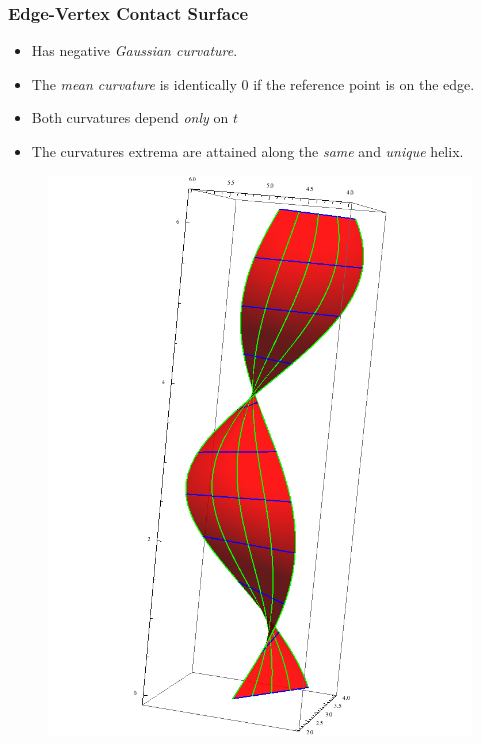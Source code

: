 \documentclass[ucs,9pt,pagenumbers]{beamer}
\begin{document}
\begin{frame}
  \frametitle{Edge-Vertex Contact Surface}
  \begin{minipage}{0.63\linewidth}
    \begin{itemize}
    \item Has negative \emph{Gaussian curvature}.
    \item The \emph{mean curvature} is identically \(0\) if the reference point
      is on the edge.
    \item Both curvatures depend \emph{only} on \(t\)
    \item The curvatures extrema are attained along the \emph{same}
      and \emph{unique} helix.
    \end{itemize}

  \end{minipage}
  \hfill
  \begin{minipage}{0.35\linewidth}
    \begin{figure}
      \centering
      \includegraphics[height=0.95\textheight]{Figures/ev-full-contact}
    \end{figure}
  \end{minipage}
\end{frame}
\end{document}
